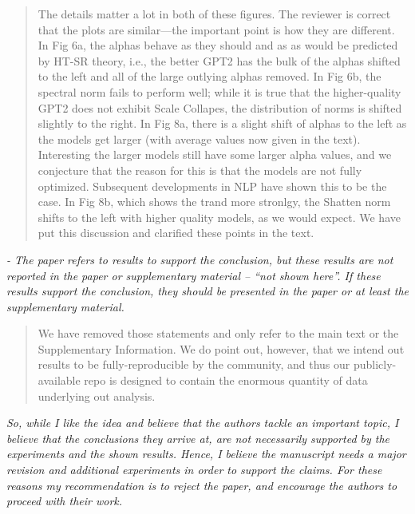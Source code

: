 \documentclass[11pt]{article}
\begin{document}
\begin{quote}
The details matter a lot in both of these figures.
The reviewer is correct that the plots are similar---the important point is how they are different.
In Fig 6a, the alphas behave as they should and as as would be predicted by HT-SR theory, i.e., the better GPT2 has the bulk of the alphas shifted to the left and all of the large outlying alphas removed. 
In Fig 6b, the spectral norm fails to perform well; while it is true that the higher-quality GPT2 does not exhibit Scale Collapes, the distribution of norms is shifted slightly to the right.
In Fig 8a, there is a slight shift of alphas to the left as the models get larger (with average values now given 
in the text).
Interesting the larger models still have some larger alpha values, and we conjecture 
that the reason for this is that the models are not fully optimized.  
Subsequent developments in NLP have shown this to be the case.
In Fig 8b, which shows the trand more stronlgy, the Shatten norm shifts to the left with higher quality models, as we would expect.
We have put this discussion and clarified these points in the text.

\end{quote}

\noindent
\emph{%
- The paper refers to results to support the conclusion, but these results are not reported in the paper or supplementary material -- ``not shown here''. If these results support the conclusion, they should be presented in the paper or at least the supplementary material.
}

\begin{quote}
We have removed those statements and only refer to the main text or the Supplementary Information.
We do point out, however, that we intend out results to be fully-reproducible by the community, and thus our publicly-available repo is designed to contain the enormous quantity of data underlying out analysis.
\end{quote}

\noindent
\emph{%
So, while I like the idea and believe that the authors tackle an important topic, I believe that the conclusions they arrive at, are not necessarily supported by the experiments and the shown results. Hence, I believe the manuscript needs a major revision and additional experiments in order to support the claims. For these reasons my recommendation is to reject the paper, and encourage the authors to proceed with their work.
}
\end{document}
